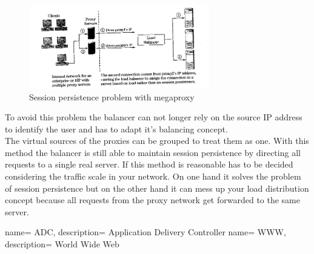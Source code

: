 \documentclass[12p]{article}
\begin{document}
	\begin{figure}[h!]
		\centering
		\includegraphics[width=0.7\textwidth]{img/SessionPersistanceProblem.png}
		\caption{Session persistence problem with megaproxy}
	\end{figure}
	
	To avoid this problem the balancer can not longer rely on the source IP address to identify the user and has to adapt it's balancing concept.\\
	The virtual sources of the proxies can be grouped to treat them as one. With this method the balancer is still able to maintain session persistence by directing all requests to a single real server. If this method is reasonable has to be decided considering the traffic scale in your network. On one hand it solves the problem of session persistence but on the other hand it can mess up your load distribution concept because all requests from the proxy network get forwarded to the same server.
	
	\newpage
	\listoffigures
	 {
		name= ADC,
		description= {Application Delivery Controller}
	}
	 {
		name= WWW,
		description= {World Wide Web}
	}
	\printglossaries
	
	\newpage
	
	
	
	\newpage
\end{document}
